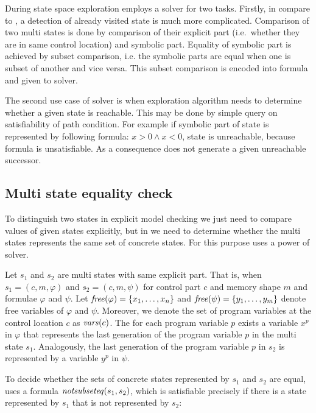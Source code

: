 During state space exploration \SymDIVINE employs a \SMT solver for two tasks.
Firstly, in compare to \DIVINE, a detection of already visited state is much
more complicated. Comparison of two multi states is done by comparison of their
explicit part (i.e.~whether they are in same control location) and symbolic
part. Equality of symbolic part is achieved by subset comparison, i.e. the
symbolic parts are equal when one is subset of another and vice versa.
This subset comparison is encoded into \SMT formula and given to
\SMT solver.

The second use case of \SMT solver is when exploration algorithm needs to
determine whether a given state is reachable. This may be done by simple query
on satisfiability of path condition. For example if symbolic part of state is
represented by following formula: $x > 0 \wedge x < 0$, state is unreachable,
because formula is unsatisfiable. As a consequence \SymDIVINE does
not generate a given unreachable successor.

\subsection{Multi state equality check}\label{subsec:equality}

To distinguish two states in explicit model checking we just need to compare values of
given states explicitly, but in \SymDIVINE we need to determine whether the
multi states represents the same set of concrete states. For this purpose \SymDIVINE
uses a power of \SMT solver.

Let $s_1$ and $s_2$ are multi states with same explicit part. That is, when $s_1
= (c, m, \varphi)$ and $s_2 = (c, m, \psi)$ for control part $c$ and
memory shape $m$ and formulae $\varphi$ and $\psi$. Let $\mathit{free}(\varphi) = \{x_1,
\dots, x_n\}$ and
$\mathit{free}(\psi) = \{ y_1, \dots, y_m\}$ denote free variables of $\varphi$ and
$\psi$. Moreover, we denote the set of program variables at the control location
$c$ as $\mathit{vars}(c)$. The for each program variable $p$ exists a variable $x^p$ in
$\varphi$ that represents the last generation of the program  variable $p$ in
the multi state $s_1$. Analogously, the last generation of the program variable
$p$ in $s_2$ is represented by a variable $y^p$ in $\psi$.

To decide whether the sets of concrete states represented by $s_1$ and $s_2$ are
equal, \SymDIVINE uses a formula $\mathit{notsubseteq}(s_1, s_2)$, which is satisfiable
precisely if there is a state represented by $s_1$ that is not represented by
$s_2$:

